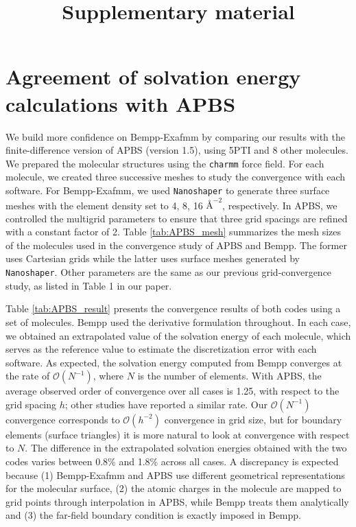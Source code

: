 \documentclass[12pt]{article}
\title{Supplementary material}
\begin{document}
\maketitle

\section{Agreement of solvation energy calculations with APBS}
We build more confidence on Bempp-Exafmm by comparing our results with the finite-difference version of APBS (version 1.5), using 5PTI and 8 other molecules.
We prepared the molecular structures using the \texttt{charmm} force field.
For each molecule, we created three successive meshes to study the convergence with each software.
For Bempp-Exafmm, we used \texttt{Nanoshaper} to generate three surface meshes with the element density set to 4, 8, 16 ${\si{\angstrom}}^{-2}$, respectively.
In APBS, we controlled the multigrid parameters to ensure that three grid spacings are refined with a constant factor of 2.
Table \ref{tab:APBS_mesh} summarizes the mesh sizes of the molecules used in the convergence study of APBS and Bempp.
The former uses Cartesian grids while the latter uses surface meshes generated by \texttt{Nanoshaper}.
Other parameters are the same as our previous grid-convergence study, as listed in Table 1 in our paper.

Table \ref{tab:APBS_result} presents the convergence results of both codes using a set of molecules.
Bempp used the derivative formulation throughout.
In each case, we obtained an extrapolated value of the solvation energy of each molecule, which serves as the reference value to estimate the discretization error with each software.
As expected, the solvation energy computed from Bempp converges at the rate of $\mathcal{O}(N^{-1})$, where $N$ is the number of elements.
With APBS, the average observed order of convergence over all cases is 1.25, with respect to the grid spacing $h$; other studies \cite{CooperBardhanBarba2014,GengKrasny2013} have reported a similar rate. 
Our $\mathcal{O}(N^{-1})$ convergence corresponds to $\mathcal{O}(h^{-2})$ convergence in grid size, but for boundary elements (surface triangles) it is more natural to look at convergence with respect to $N$.
The difference in the extrapolated solvation energies obtained with the two codes varies between 0.8\% and 1.8\% across all cases.
A discrepancy is expected because (1) Bempp-Exafmm and APBS use different geometrical representations for the molecular surface, (2) the atomic charges in the molecule are mapped to grid points through interpolation in APBS, while Bempp treats them analytically and (3) the far-field boundary condition is exactly imposed in Bempp.
\end{document}
